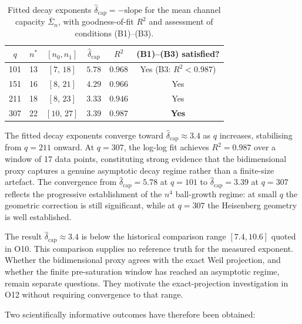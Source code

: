 \documentclass[11pt,a4paper]{article}
\newcommand{\Sigbar}{\bar{\Sigma}}
\newcommand{\dcap}{\delta_{\mathrm{cap}}}
\begin{document}
    \begin{table}[ht]
      \centering
      \caption{Fitted decay exponents $\hat\dcap = -\mathrm{slope}$ for the mean channel capacity
        $\Sigbar_n$, with goodness-of-fit $R^2$ and assessment of conditions (B1)--(B3).}
      \label{tab:delta}
      \begin{tabular}{cccccc}
        \toprule
        $q$ & $n^*$ & $[n_0, n_1]$ & $\hat\dcap$     & $R^2$            & (B1)--(B3) satisfied?   \\
        \midrule
        101 & 13    & $[7,\,18]$   & $5.78$          & $0.968$          & Yes (B3: $R^2 < 0.987$) \\
        151 & 16    & $[8,\,21]$   & $4.29$          & $0.966$          & Yes                     \\
        211 & 18    & $[8,\,23]$   & $3.33$          & $0.946$          & Yes                     \\
        307 & 22    & $[10,\,27]$  & $\mathbf{3.39}$ & $\mathbf{0.987}$ & \textbf{Yes}            \\
        \bottomrule
      \end{tabular}
    \end{table}

    The fitted decay exponents converge toward $\hat\dcap \approx 3.4$ as $q$ increases,
    stabilising from $q = 211$ onward.
    At $q = 307$, the log-log fit achieves $R^2 = 0.987$ over a window of 17 data points,
    constituting strong evidence that the bidimensional proxy captures a genuine asymptotic
    decay regime rather than a finite-size artefact.
    The convergence from $\hat\dcap = 5.78$ at $q = 101$ to $\hat\dcap = 3.39$ at $q = 307$
    reflects the progressive establishment of the $n^4$ ball-growth regime: at small $q$ the
    geometric correction is still significant, while at $q = 307$ the Heisenberg geometry is
    well established.

    The result $\hat\dcap \approx 3.4$ is below the historical comparison range $[7.4, 10.6]$ quoted in O10.
    This comparison supplies no reference truth for the measured exponent.
    Whether the bidimensional proxy agrees with the exact Weil projection, and whether
    the finite pre-saturation window has reached an asymptotic regime, remain separate questions.
    They motivate the exact-projection investigation in O12 without requiring convergence to that range.

    Two scientifically informative outcomes have therefore been obtained:
\end{document}
